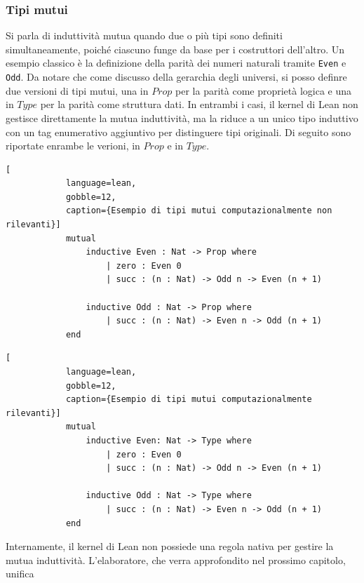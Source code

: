 \subsubsection{Tipi mutui}
Si parla di induttività mutua quando due o più tipi sono definiti simultaneamente, poiché ciascuno funge da base per i costruttori dell'altro. 
Un esempio classico è la definizione della parità dei numeri naturali tramite \texttt{Even} e \texttt{Odd}. Da notare che come discusso della
gerarchia degli universi, si posso definre due versioni di tipi mutui, una in $Prop$ per la parità come proprietà logica e una in $Type$ per la 
parità come struttura dati. In entrambi i casi, il kernel di Lean non gestisce direttamente la mutua induttività, ma la riduce a un unico tipo 
induttivo con un tag enumerativo aggiuntivo per distinguere tipi originali. Di seguito sono riportate enrambe le verioni, in $Prop$ e in $Type$.
\begin{center}
    \begin{minipage}{0.85\textwidth}
        \begin{lstlisting}[
            language=lean, 
            gobble=12,
            caption={Esempio di tipi mutui computazionalmente non rilevanti}]
            mutual
                inductive Even : Nat -> Prop where
                    | zero : Even 0
                    | succ : (n : Nat) -> Odd n -> Even (n + 1)

                inductive Odd : Nat -> Prop where
                    | succ : (n : Nat) -> Even n -> Odd (n + 1)
            end
        \end{lstlisting}
    \end{minipage}
\end{center}
\begin{center}
    \begin{minipage}{0.85\textwidth}
        \begin{lstlisting}[
            language=lean, 
            gobble=12,
            caption={Esempio di tipi mutui computazionalmente rilevanti}]
            mutual
                inductive Even: Nat -> Type where
                    | zero : Even 0
                    | succ : (n : Nat) -> Odd n -> Even (n + 1)

                inductive Odd : Nat -> Type where
                    | succ : (n : Nat) -> Even n -> Odd (n + 1)
            end
        \end{lstlisting}
    \end{minipage}
\end{center}
Internamente, il kernel di Lean non possiede una regola nativa per gestire la mutua induttività. L'elaboratore, che verra approfondito nel prossimo capitolo, unifica 
